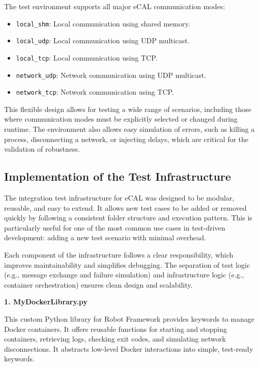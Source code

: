 The test environment supports all major eCAL communication modes:

\begin{itemize}
	\item \texttt{local\_shm}: Local communication using shared memory.
	\item \texttt{local\_udp}: Local communication using UDP multicast.
	\item \texttt{local\_tcp}: Local communication using TCP.
	\item \texttt{network\_udp}: Network communication using UDP multicast.
	\item \texttt{network\_tcp}: Network communication using TCP.\\
\end{itemize}

This flexible design allows for testing a wide range of scenarios, including those where communication modes must be explicitly selected or changed during runtime. The environment also allows easy simulation of errors, such as killing a process, disconnecting a network, or injecting delays, which are critical for the validation of robustness.

\subsection{Implementation of the Test Infrastructure}

The integration test infrastructure for eCAL was designed to be modular, reusable, and easy to extend. It allows new test cases to be added or removed quickly by following a consistent folder structure and execution pattern. This is particularly useful for one of the most common use cases in test-driven development: adding a new test scenario with minimal overhead.

\vspace{0.5em}
Each component of the infrastructure follows a clear responsibility, which improves maintainability and simplifies debugging. The separation of test logic (e.g., message exchange and failure simulation) and infrastructure logic (e.g., container orchestration) ensures clean design and scalability.

\vspace{1em}
\textbf{1. MyDockerLibrary.py}

\vspace{0.3em}
This custom Python library for Robot Framework provides keywords to manage Docker containers. It offers reusable functions for starting and stopping containers, retrieving logs, checking exit codes, and simulating network disconnections. It abstracts low-level Docker interactions into simple, test-ready keywords.

